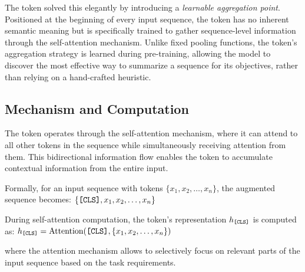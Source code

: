 The \cls{} token solved this elegantly by introducing a \emph{learnable aggregation point}. Positioned at the beginning of every input sequence, the \cls{} token has no inherent semantic meaning but is specifically trained to gather sequence-level information through the self-attention mechanism. Unlike fixed pooling functions, the \cls{} token's aggregation strategy is learned during pre-training, allowing the model to discover the most effective way to summarize a sequence for its objectives, rather than relying on a hand-crafted heuristic.

\subsection{Mechanism and Computation}

The \cls{} token operates through the self-attention mechanism, where it can attend to all other tokens in the sequence while simultaneously receiving attention from them. This bidirectional information flow enables the \cls{} token to accumulate contextual information from the entire input.

Formally, for an input sequence with tokens $\{x_1, x_2, \ldots, x_n\}$, the augmented sequence becomes:
$\{\texttt{[CLS]}{}, x_1, x_2, \ldots, x_n\}$

During self-attention computation, the \cls{} token's representation $h_{\texttt{[CLS]}{}}$ is computed as:
$h_{\texttt{[CLS]}{}} = \text{Attention}(\texttt{[CLS]}{}, \{x_1, x_2, \ldots, x_n\})$

where the attention mechanism allows \cls{} to selectively focus on relevant parts of the input sequence based on the task requirements.


